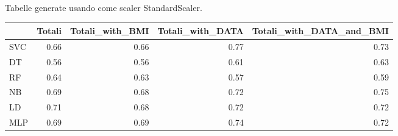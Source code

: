 \documentclass[12pt,italian]{report}
\begin{document}
Tabelle generate usando come scaler StandardScaler.
\begin{table}[ht]
	\begin{center}
		\begin{adjustbox}{max width=\textwidth, max totalheight= {3.3cm}}
			\begin{tabular}{lrrrr}
				\toprule
				{} &    Totali &  Totali\_with\_BMI &  Totali\_with\_DATA &  Totali\_with\_DATA\_and\_BMI \\
				\midrule
				SVC &  0.66 &         0.66 &          0.77 &                  0.73 \\
				DT  &  0.56 &         0.56 &          0.61 &                  0.63 \\
				RF  &  0.64 &         0.63 &          0.57 &                  0.59 \\
				NB  &  0.69 &         0.68 &          0.72 &                  0.75 \\
				LD  &  0.71 &         0.68 &          0.72 &                  0.72 \\
				MLP &  0.69 &         0.69 &          0.74 &                  0.72 \\
				\bottomrule
			\end{tabular}
		\end{adjustbox}
	\end{center}
\end{table}
\end{document}
